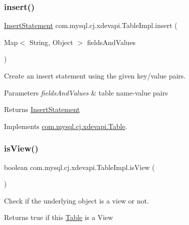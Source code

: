 \subsubsection{\texorpdfstring{insert()}{insert()}\hspace{0.1cm}{\footnotesize\ttfamily [3/3]}}
{\footnotesize\ttfamily \mbox{\hyperlink{interfacecom_1_1mysql_1_1cj_1_1xdevapi_1_1_insert_statement}{Insert\+Statement}} com.\+mysql.\+cj.\+xdevapi.\+Table\+Impl.\+insert (\begin{DoxyParamCaption}\item[{Map$<$ String, Object $>$}]{fields\+And\+Values }\end{DoxyParamCaption})}

Create an insert statement using the given key/value pairs.


\begin{DoxyParams}{Parameters}
{\em fields\+And\+Values} & table name-\/value pairs \\
\hline
\end{DoxyParams}
\begin{DoxyReturn}{Returns}
\mbox{\hyperlink{interfacecom_1_1mysql_1_1cj_1_1xdevapi_1_1_insert_statement}{Insert\+Statement}} 
\end{DoxyReturn}


Implements \mbox{\hyperlink{interfacecom_1_1mysql_1_1cj_1_1xdevapi_1_1_table_a2a66f6dde400c00f896c02673e7fdc84}{com.\+mysql.\+cj.\+xdevapi.\+Table}}.

\mbox{\label{classcom_1_1mysql_1_1cj_1_1xdevapi_1_1_table_impl_a92b2db897ad5ce4f950422956bfc4027}} 
\subsubsection{\texorpdfstring{is\+View()}{isView()}}
{\footnotesize\ttfamily boolean com.\+mysql.\+cj.\+xdevapi.\+Table\+Impl.\+is\+View (\begin{DoxyParamCaption}{ }\end{DoxyParamCaption})}

Check if the underlying object is a view or not.

\begin{DoxyReturn}{Returns}
true if this \mbox{\hyperlink{interfacecom_1_1mysql_1_1cj_1_1xdevapi_1_1_table}{Table}} is a View 
\end{DoxyReturn}


